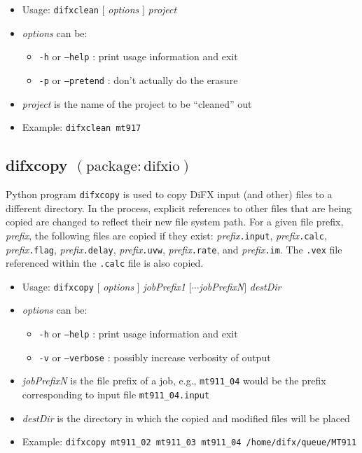 \begin{itemize}
\item[] Usage: {\tt difxclean} $[$ {\em options} $]$ {\em project}
\item[] {\em options} can be:
\begin{itemize}
\item[] {\tt -h} or {\tt --help} : print usage information and exit
\item[] {\tt -p} or {\tt --pretend} : don't actually do the erasure
\end{itemize}
\item[] {\em project} is the name of the project to be ``cleaned'' out
\item[] Example: {\tt difxclean mt917}
\end{itemize}









\subsection{difxcopy {\small $\mathrm{(package: difxio)}$}} \label{sec:difxcopy}

Python program {\tt difxcopy} is used to copy DiFX input (and other) files to a different directory.
In the process, explicit references to other files that are being copied are changed to reflect their
new file system path.
For a given file prefix, {\em prefix}, the following files are copied if they exist: {\em prefix}{\tt .input}, {\em prefix}{\tt .calc}, {\em prefix}{\tt .flag}, {\em prefix}{\tt .delay}, {\em prefix}{\tt .uvw}, {\em prefix}{\tt .rate}, and {\em prefix}{\tt .im}.
The {\tt .vex} file referenced within the {\tt .calc} file is also copied.

\begin{itemize}
\item[] Usage: {\tt difxcopy} $[$ {\em options} $]$ {\em jobPrefix1} $[\cdots${\em jobPrefixN}$]$ {\em destDir}
\item[] {\em options} can be:
\begin{itemize}
\item[] {\tt -h} or {\tt --help} : print usage information and exit
\item[] {\tt -v} or {\tt --verbose} : possibly increase verbosity of output
\end{itemize}
\item[] {\em jobPrefixN} is the file prefix of a job, e.g., {\tt mt911\_04} would be the prefix corresponding to input file {\tt mt911\_04.input}
\item[] {\em destDir} is the directory in which the copied and modified files will be placed
\item[] Example: {\tt difxcopy mt911\_02 mt911\_03 mt911\_04 /home/difx/queue/MT911}
\end{itemize}











